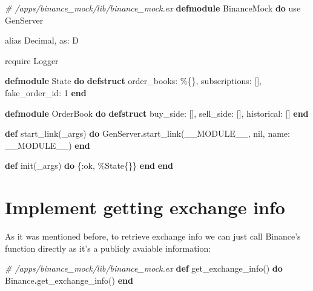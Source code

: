 \documentclass[
]{book}
\newenvironment{Shaded}{\begin{snugshade}}{\end{snugshade}}
\newcommand{\CommentTok}[1]{\textcolor[rgb]{0.56,0.35,0.01}{\textit{#1}}}
\newcommand{\ConstantTok}[1]{\textcolor[rgb]{0.00,0.00,0.00}{#1}}
\newcommand{\DecValTok}[1]{\textcolor[rgb]{0.00,0.00,0.81}{#1}}
\newcommand{\ImportTok}[1]{#1}
\newcommand{\KeywordTok}[1]{\textcolor[rgb]{0.13,0.29,0.53}{\textbf{#1}}}
\newcommand{\NormalTok}[1]{#1}
\newcommand{\OperatorTok}[1]{\textcolor[rgb]{0.81,0.36,0.00}{\textbf{#1}}}
\newcommand{\VariableTok}[1]{\textcolor[rgb]{0.00,0.00,0.00}{#1}}
\begin{document}
\begin{Shaded}
\begin{Highlighting}[]
\CommentTok{\# /apps/binance\_mock/lib/binance\_mock.ex}
\KeywordTok{defmodule} \ConstantTok{BinanceMock} \KeywordTok{do}
  \ImportTok{use} \ConstantTok{GenServer}

  \ImportTok{alias} \ConstantTok{Decimal}\NormalTok{, }\VariableTok{as:}\NormalTok{ D}

  \ImportTok{require} \ConstantTok{Logger}

  \KeywordTok{defmodule} \ConstantTok{State} \KeywordTok{do}
    \KeywordTok{defstruct} \VariableTok{order\_books:}\NormalTok{ \%\{\}, }\VariableTok{subscriptions:}\NormalTok{ [], }\VariableTok{fake\_order\_id:} \DecValTok{1}
  \KeywordTok{end}

  \KeywordTok{defmodule} \ConstantTok{OrderBook} \KeywordTok{do}
    \KeywordTok{defstruct} \VariableTok{buy\_side:}\NormalTok{ [], }\VariableTok{sell\_side:}\NormalTok{ [], }\VariableTok{historical:}\NormalTok{ []}
  \KeywordTok{end}  

  \KeywordTok{def}\NormalTok{ start\_link(\_args) }\KeywordTok{do}
    \ConstantTok{GenServer}\OperatorTok{.}\NormalTok{start\_link(}\ConstantTok{\_\_MODULE\_\_}\NormalTok{, }\ConstantTok{nil}\NormalTok{, }\VariableTok{name:} \ConstantTok{\_\_MODULE\_\_}\NormalTok{)}
  \KeywordTok{end}

  \KeywordTok{def}\NormalTok{ init(\_args) }\KeywordTok{do}
\NormalTok{    \{}\VariableTok{:ok}\NormalTok{, \%}\ConstantTok{State}\NormalTok{\{\}\}}
  \KeywordTok{end}
\KeywordTok{end}
\end{Highlighting}
\end{Shaded}

\hypertarget{implement-getting-exchange-info}{%
\section{Implement getting exchange info}\label{implement-getting-exchange-info}}

As it was mentioned before, to retrieve exchange info we can just call Binance's function directly as it's a publicly avaiable information:

\begin{Shaded}
\begin{Highlighting}[]
\CommentTok{\# /apps/binance\_mock/lib/binance\_mock.ex}
  \KeywordTok{def}\NormalTok{ get\_exchange\_info() }\KeywordTok{do}
    \ConstantTok{Binance}\OperatorTok{.}\NormalTok{get\_exchange\_info()}
  \KeywordTok{end}
\end{Highlighting}
\end{Shaded}
\end{document}
